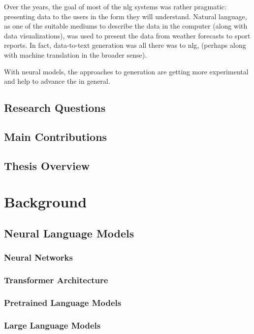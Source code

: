 \documentclass[12pt,notitlepage,a4paper,openright]{report}
\begin{document}
Over the years, the goal of most of the \acrshort{nlg} systems was rather pragmatic: presenting data to the users in the form they will understand. Natural language, as one of the suitable mediums to describe the data in the computer (along with data visualizations), was used to present the data from weather forecasts to sport reports. In fact, data-to-text generation was all there was to \acrshort{nlg}, (perhaps along with machine translation in the broader sense).

With neural models, the approaches to  generation are getting more experimental and help to advance the  in general.



\section{Research Questions}
\section{Main Contributions}
\section{Thesis Overview}

\chapter{Background}
\section{Neural Language Models}
\subsection{Neural Networks}
\subsection{Transformer Architecture}
\subsection{Pretrained Language Models}
\subsection{Large Language Models}
\end{document}
